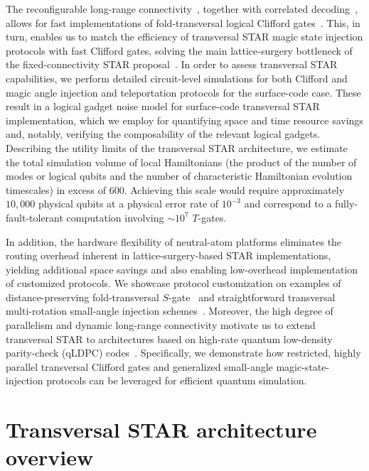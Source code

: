 \documentclass[aps, prx, reprint, superscriptaddress, longbibliography, floatfix]{revtex4-2}
\begin{document}
The reconfigurable long-range connectivity~\cite{Bluvstein2022, Evered2023, Bluvstein2024, Bluvstein2025b}, together with correlated decoding~\cite{Cain2025}, allows for fast implementations of fold-transversal logical Clifford gates~\cite{Breuckmann2024, Zhou2024}. This, in turn, enables us to match the efficiency of transversal STAR magic state injection protocols with fast Clifford gates, solving the main lattice-surgery bottleneck of the fixed-connectivity STAR proposal~\cite{Toshio2024}. In order to assess transversal STAR capabilities, we perform detailed circuit-level simulations for both Clifford and magic angle injection and teleportation protocols for the surface-code case. These result in a logical gadget noise model for surface-code transversal STAR implementation, which we employ for quantifying space and time resource savings and, notably, verifying the composability of the relevant logical gadgets.  Describing the utility limits of the transversal STAR architecture, we estimate the total simulation volume of local Hamiltonians (the product of the number of modes or logical qubits and the number of characteristic Hamiltonian evolution timescales) in excess of 600. Achieving this scale would require approximately $10{,}000$ physical qubits at a physical error rate of $10^{-3}$ and correspond to a fully-fault-tolerant computation involving $\sim 10^7$ $T$-gates.


In addition, the hardware flexibility of neutral-atom platforms eliminates the routing overhead inherent in lattice-surgery-based STAR implementations, yielding additional space savings and also enabling low-overhead implementation of customized protocols. We showcase protocol customization on examples of distance-preserving fold-transversal $S$-gate~\cite{Chen2024} and straightforward transversal multi-rotation small-angle injection schemes~\cite{Gavriel2023, Toshio2024}. Moreover, the high degree of parallelism and dynamic long-range connectivity motivate us to extend transversal STAR to architectures based on high-rate quantum low-density parity-check (qLDPC) codes~\cite{Breuckmann2021, Lawrence2022, Quintavalle2023, Bravyi2024, Xu2024}. Specifically, we demonstrate how restricted, highly parallel transversal Clifford gates and generalized small-angle magic-state-injection protocols can be leveraged for efficient quantum simulation.







\section{Transversal STAR architecture overview}
\label{sec:STARoverview}
\end{document}
